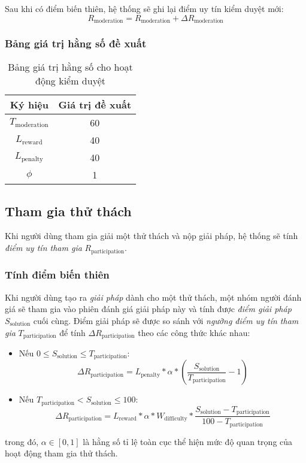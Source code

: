 Sau khi có điểm biến thiên, hệ thống sẽ ghi lại điểm uy tín kiểm duyệt mới:
\[R_{\text{moderation}} = R_{\text{moderation}} + \Delta R_{\text{moderation}}\]

\subsubsection{Bảng giá trị hằng số đề xuất}

\begin{table}[H]
  \centering
  \small
  \begin{tabular}{|c|c|}
    \hline
    \textbf{Ký hiệu}        & \textbf{Giá trị đề xuất} \\ \hline
    $T_{\text{moderation}}$ & 60                       \\ \hline
    $L_{\text{reward}}$     & 40                       \\ \hline
    $L_{\text{penalty}}$    & 40                       \\ \hline
    $\phi$                  & 1                        \\ \hline
  \end{tabular}
  \caption{Bảng giá trị hằng số cho hoạt động kiểm duyệt}
  \label{tab:suggested-constant-values-for-moderation}
\end{table}

\subsection{Tham gia thử thách}

Khi người dùng tham gia giải một thử thách và nộp giải pháp, hệ thống sẽ tính \textit{điểm uy tín tham gia} $R_{\text{participation}}$.

\subsubsection{Tính điểm biến thiên}

Khi người dùng tạo ra \textit{giải pháp} dành cho một thử thách, một nhóm người đánh giá sẽ tham gia vào phiên đánh giá giải pháp này và tính được \textit{điểm giải pháp} $S_{\text{solution}}$ cuối cùng.
Điểm giải pháp sẽ được so sánh với \textit{ngưỡng điểm uy tín tham gia} $T_{\text{participation}}$ để tính $\Delta R_{\text{participation}}$ theo các công thức khác nhau:

\begin{itemize}
  \item Nếu $0 \leq S_{\text{solution}} \leq  T_{\text{participation}}$:
        \[\Delta R_{\text{participation}} = L_{\text{penalty}} * \alpha * \left( \frac{S_{\text{solution}}}{T_{\text{participation}}}-1 \right)\]
  \item Nếu $T_{\text{participation}} < S_{\text{solution}} \leq 100$:
        \[\Delta R_{{\text{participation}}} = L_{\text{reward}} * \alpha*W_{\text{difficulty}} * \frac{S_{\text{solution}} - T_{\text{participation}}}{100-T_{\text{participation}}} \]
\end{itemize}
trong đó, $\alpha \in [0, 1]$ là hằng số tỉ lệ toàn cục thể hiện mức độ quan trọng của hoạt động tham gia thử thách.

